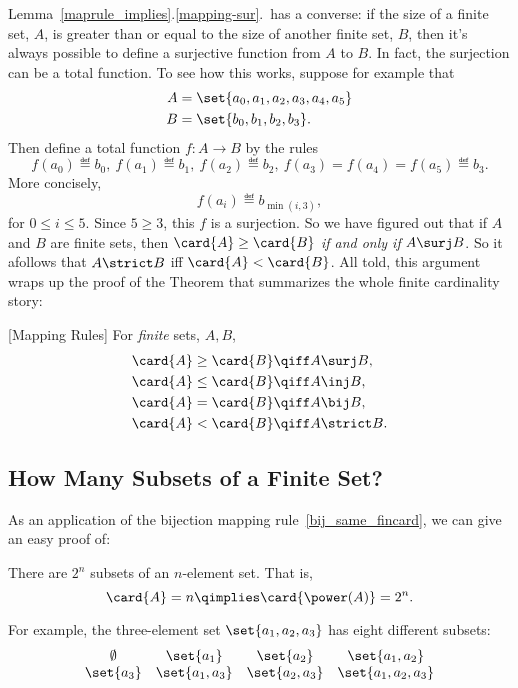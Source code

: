 Lemma~\ref{maprule_implies}.\ref{mapping-sur}.\ has a converse:
if the size of a finite set, $A$, is greater than or equal to the size of
another finite set, $B$, then it's always possible to define a
surjective function from $A$ to $B$.  In fact, the surjection can be a
total function.  To see how this works, suppose for example that
\begin{align*}
A & =\set{a_0,a_1,a_2,a_3,a_4,a_5}\\
B & =\set{b_0,b_1,b_2,b_3}.
\end{align*}
Then define a total function $f:A\to B$ by the rules
\[
f(a_0) \eqdef b_0,\  f(a_1) \eqdef b_1,\  f(a_2) \eqdef b_2,\  f(a_3)=
f(a_4)=f(a_5) \eqdef b_3.
\]
More concisely,
\[
f(a_i) \eqdef b_{\min(i,3)},
\]
for $0 \le i \le 5$.  Since $5 \geq 3$, this $f$ is a surjection.
\iffalse In fact, if $A$ and $B$ are finite sets of the same size,
then we could also define a bijection from $A$ to $B$ by this method.
\fi So we have figured out that if $A$ and $B$ are finite sets, then
$\card{A} \geq \card{B}$ \emph{if and only if} $A \surj B$.  So it
afollows that $A \strict B$ iff $\card{A} < \card{B}$.  All told, this
argument wraps up the proof of the Theorem that summarizes the whole
finite cardinality story:
\begin{theorem}\label{maprul_thm}
[Mapping Rules] \mbox{}
For \emph{finite} sets, $A,B$,
\begin{align}
\card{A} \geq \card{B} & \qiff A \surj B,\\
\card{A} \leq \card{B} & \qiff A \inj B,\\
\card{A} = \card{B}    & \qiff A \bij B,\label{bij_same_fincard}\\
\card{A} < \card{B}    & \qiff A \strict B.
\end{align}
\end{theorem}

\subsection{How Many Subsets of a Finite Set?}
As an application of the bijection mapping
rule~\eqref{bij_same_fincard}, we can give an
easy proof of:
\begin{theorem}\label{powset_fincard}
There are $2^n$ subsets of an $n$-element set.  That is,
\[
\card{A} = n \qimplies \card{\power(A)} = 2^n.
\]
\end{theorem}

For example, the three-element set $\set{a_1, a_2, a_3}$ has eight
different subsets:
%
\[
\begin{array}{cccc}
\emptyset & \set{a_1} & \set{a_2} & \set{a_1, a_2} \\
\set{a_3} & \set{a_1, a_3} & \set{a_2, a_3} & \set{a_1, a_2, a_3}
\end{array}
\]

